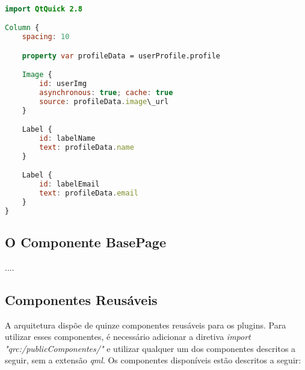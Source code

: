\begin{center}
\begin{lstlisting}[language=qml]

import QtQuick 2.8

Column {
	spacing: 10

	property var profileData = userProfile.profile

	Image {
		id: userImg
		asynchronous: true; cache: true
		source: profileData.image\_url
	}

	Label {
		id: labelName
		text: profileData.name
	}

	Label {
		id: labelEmail
		text: profileData.email
	}
}
\end{lstlisting}
\end{center}


\subsection{O Componente BasePage}\label{sec:solucao-desenvolvida}
....


\subsection{Componentes Reusáveis}\label{sec:solucao-desenvolvida}
A arquitetura dispõe de quinze componentes reusáveis para os plugins. Para utilizar esses componentes, é necessário adicionar a diretiva \textit{import "qrc:/publicComponentes/"} e utilizar qualquer um dos componentes descritos a seguir, sem a extensão \textit{qml}. Os componentes disponíveis estão descritos a seguir:

